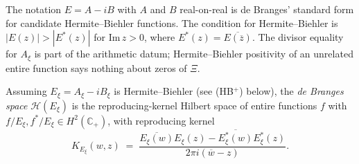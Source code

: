 \begin{remark}
\label{v4-arith:w5-j:rem:de-branges-convention}
The notation \(E=A-iB\) with \(A\) and \(B\) real-on-real is de
Branges' standard form for candidate Hermite--Biehler functions. The
condition for Hermite--Biehler is
\(|E(z)|>|E^{*}(z)|\) for \(\mathrm{Im}\,z>0\), where
\(E^{*}(z)=\overline{E(\overline{z})}\).  The divisor equality for \(A_{\xi}\)
is part of the arithmetic datum; Hermite--Biehler positivity of an
unrelated entire function says nothing about zeros of \(\Xi\).
\end{remark}

\begin{definition}
\label{v4-arith:w5-j:def:dB-space}
Assuming \(E_{\xi}=A_{\xi}-iB_{\xi}\) is
Hermite--Biehler (see (HB\(^{+}\)) below), the
\emph{de Branges space} \(\mathcal{H}(E_{\xi})\) is the
reproducing-kernel Hilbert space of entire functions \(f\) with
\(f/E_{\xi},f^{*}/E_{\xi}\in H^{2}(\mathbb{C}_{+})\), with
reproducing kernel
\begin{equation}
\label{v4-arith:w5-j:eq:dB-kernel}
K_{E_{\xi}}(w,z)
\;=\;\frac{\overline{E_{\xi}(w)}E_{\xi}(z)-\overline{E_{\xi}^{*}(w)}E_{\xi}^{*}(z)}{2\pi i(\overline{w}-z)}.
\end{equation}
\end{definition}

